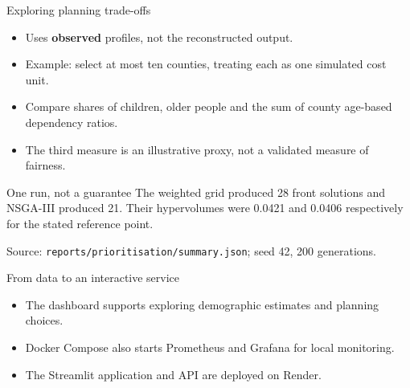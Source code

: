 \documentclass[aspectratio=169,11pt]{beamer}
\begin{document}
\begin{frame}{Exploring planning trade-offs}
  \begin{itemize}
    \item Uses \textbf{observed} profiles, not the reconstructed output.
    \item Example: select at most ten counties, treating each as one simulated cost unit.
    \item Compare shares of children, older people and the sum of county age-based
    dependency ratios.
    \item The third measure is an illustrative proxy, not a validated measure of fairness.
  \end{itemize}
  \begin{block}{One run, not a guarantee}
    The weighted grid produced 28 front solutions and NSGA-III produced 21.
    Their hypervolumes were 0.0421 and 0.0406 respectively for the stated reference point.
  \end{block}
  \tiny Source: \texttt{reports/prioritisation/summary.json}; seed 42, 200 generations.
\end{frame}

\begin{frame}{From data to an interactive service}
  \centering
  \vspace{1em}
  \begin{itemize}
    \item The dashboard supports exploring demographic estimates and planning choices.
    \item Docker Compose also starts Prometheus and Grafana for local monitoring.
    \item The Streamlit application and API are deployed on Render.
  \end{itemize}
\end{frame}
\end{document}
